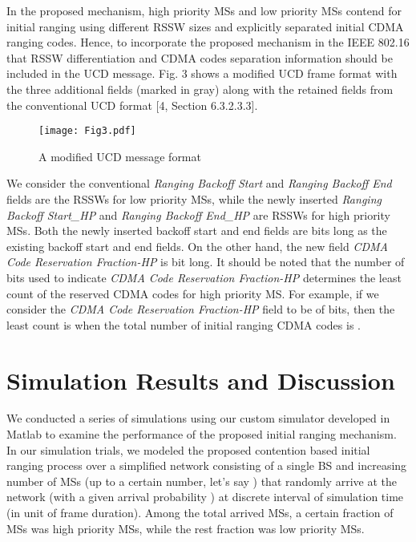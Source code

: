 \documentclass[preprint,12pt]{elsarticle}
\begin{document}
In the proposed mechanism, high priority MSs and low priority MSs contend for initial ranging using different RSSW sizes and explicitly separated initial CDMA ranging codes. Hence, to incorporate the proposed mechanism in the IEEE 802.16 that RSSW differentiation and CDMA codes separation information should be included in the UCD message. Fig. 3 shows a modified UCD frame format with the three additional fields (marked in gray) along with the retained fields from the conventional UCD format [4, Section 6.3.2.3.3].


\begin{figure}[h]
\centering
\texttt{[image: Fig3.pdf]}
\centering
\caption{A modified UCD message format}
\end{figure}


We consider the conventional \emph{Ranging Backoff Start} and \emph{Ranging Backoff End} fields are the RSSWs for low priority MSs, while the newly inserted \emph{Ranging Backoff Start\_HP} and \emph{Ranging Backoff End\_HP} are RSSWs for high priority MSs.  Both the newly inserted backoff start and end fields are  bits long as the existing backoff start and end fields. On the other hand, the new field \emph{CDMA Code Reservation Fraction-HP} is  bit long. It should be noted that the number of bits used to indicate \emph{CDMA Code Reservation Fraction-HP} determines the least count of the reserved CDMA codes for high priority MS. For example, if we consider the \emph{CDMA Code Reservation Fraction-HP} field to be of  bits, then the least count is  when the total number of initial ranging CDMA codes is .

\section{Simulation Results and Discussion}

We conducted a series of simulations using our custom simulator developed in Matlab to examine the performance of the proposed initial ranging mechanism. In our simulation trials, we modeled the proposed contention based initial ranging process over a simplified network consisting of a single BS and increasing number of MSs (up to a certain number, let’s say ) that randomly arrive at the network (with a given arrival probability ) at discrete interval of simulation time (in unit of frame duration). Among the total arrived MSs, a certain fraction of MSs was high priority MSs, while the rest fraction was low priority MSs.
\end{document}
